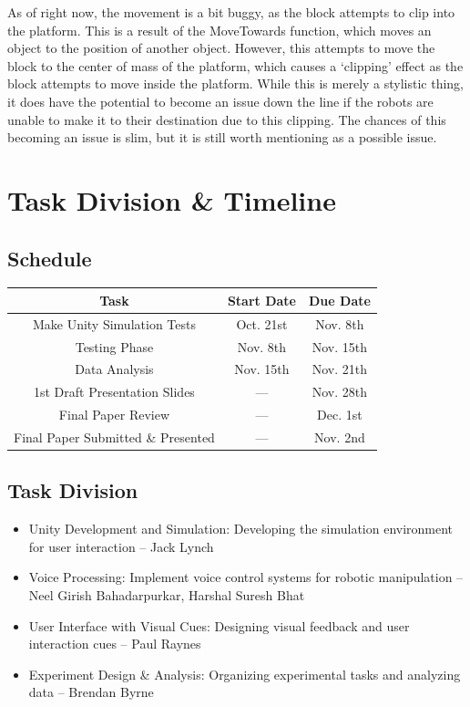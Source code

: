 \documentclass[conference]{IEEEtran}
\begin{document}
As of right now, the movement is a bit buggy, as the block attempts to clip into the platform. This is a result of the MoveTowards function, which moves an object to the position of another object. However, this attempts to move the block to the center of mass of the platform, which causes a ‘clipping’ effect as the block attempts to move inside the platform. While this is merely a stylistic thing, it does have the potential to become an issue down the line if the robots are unable to make it to their destination due to this clipping. The chances of this becoming an issue is slim, but it is still worth mentioning as a possible issue.

\section{Task Division \& Timeline}
\subsection{Schedule}
\begin{table}[htbp]
\begin{center}
\begin{tabular}{|c|c|c|}
\hline
\textbf{Task} & \textbf{Start Date} & \textbf{Due Date} \\
\hline
Make Unity Simulation Tests & Oct. 21st & Nov. 8th \\
\hline
Testing Phase & Nov. 8th & Nov. 15th \\
\hline
Data Analysis & Nov. 15th & Nov. 21th \\
\hline
1st Draft Presentation Slides & --- & Nov. 28th \\
\hline
Final Paper Review & --- & Dec. 1st \\
\hline
Final Paper Submitted \& Presented & --- & Nov. 2nd \\
\hline
\end{tabular}
\label{tab1}
\end{center}
\end{table}

\subsection{Task Division}
\begin{itemize}
\item Unity Development and Simulation: Developing the simulation environment for user interaction – Jack Lynch 
\item Voice Processing: Implement voice control systems for robotic manipulation – Neel Girish Bahadarpurkar, Harshal Suresh Bhat 
\item User Interface with Visual Cues: Designing visual feedback and user interaction cues – Paul Raynes 
\item Experiment Design \& Analysis: Organizing experimental tasks and analyzing data – Brendan Byrne 
\end{itemize}
\end{document}
